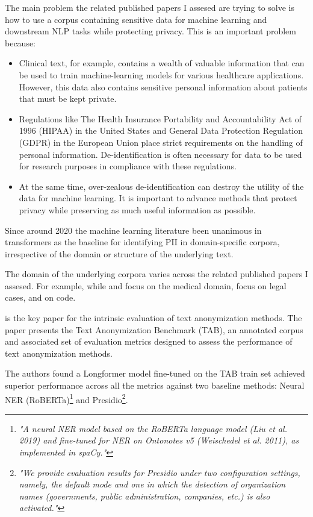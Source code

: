 \documentclass[11pt]{article}
\begin{document}
The main problem the related published papers I assesed are trying to solve is how to use a corpus containing sensitive data for machine learning and downstream NLP tasks while protecting privacy. This is an important problem because:

\begin{itemize}
\item Clinical text, for example, contains a wealth of valuable information that can be used to train machine-learning models for various healthcare applications. However, this data also contains sensitive personal information about patients that must be kept private.
\item Regulations like The Health Insurance Portability and Accountability Act of 1996 (HIPAA) in the United States and General Data Protection Regulation (GDPR) in the European Union place strict requirements on the handling of personal information. De-identification is often necessary for data to be used for research purposes in compliance with these regulations.
\item At the same time, over-zealous de-identification can destroy the utility of the data for machine learning. It is important to advance methods that protect privacy while preserving as much useful information as possible.
\end{itemize}

Since around 2020 the machine learning literature been unanimous in transformers as the baseline for identifying PII in domain-specific corpora, irrespective of the domain or structure of the underlying text.

The domain of the underlying corpora varies across the related published papers I assesed. For example, while \citealt{hathurusinghe-etal-2021-privacy} and \citealt{vakili-etal-2022-downstream} focus on the medical domain, \citealt{pilan-etal-2022-text} focus on legal cases, and \citealt{vanderplas2022detecting} on code.

\citealt{pilan-etal-2022-text} is the key paper for the intrinsic evaluation of text anonymization methods. The paper presents the Text Anonymization Benchmark (TAB), an annotated corpus and associated set of evaluation metrics designed to assess the performance of text anonymization methods. 

The authors found a Longformer model fine-tuned on the TAB train set achieved superior performance across all the metrics against two baseline methods: Neural NER (RoBERTa)\footnote{\textit{"A neural NER model based on the RoBERTa language model (Liu et al. 2019) and fine-tuned for NER on Ontonotes v5 (Weischedel et al. 2011), as implemented in spaCy."}} and Presidio\footnote{\textit{"We provide evaluation results for Presidio under two configuration settings, namely, the default mode and one in which the detection of organization names (governments, public administration, companies, etc.) is also activated."}}.
\end{document}
